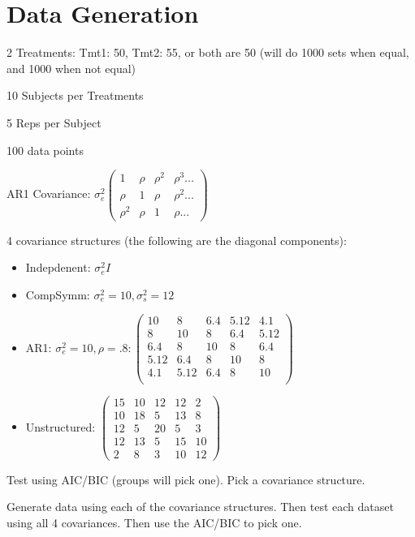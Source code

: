 \documentclass{article}
\begin{document}
\section{Data Generation}

2 Treatments: Tmt1: 50, Tmt2: 55, or both are 50 (will do 1000 sets when equal, and 1000 when not equal)

10 Subjects per Treatments

5 Reps per Subject

100 data points


AR1 Covariance: $\sigma^2_e \begin{pmatrix}
    1 & \rho & \rho^2 & \rho^3 ... \\ 
    \rho & 1 & \rho & \rho^2 ... \\
    \rho^2 & \rho & 1 & \rho ...
\end{pmatrix}$

4 covariance structures (the following are the diagonal components):
\begin{itemize}
    \item Indepdenent: $\sigma^2_e I$
    \item CompSymm: $\sigma^2_e = 10, \sigma^2_s = 12$
    \item AR1: $\sigma^2_e = 10, \rho = .8: \begin{pmatrix}
        10 & 8 & 6.4 & 5.12 & 4.1 \\
        8 & 10 & 8 & 6.4 & 5.12 \\
        6.4 & 8 & 10 & 8 & 6.4 \\
        5.12 & 6.4 & 8 & 10 & 8 \\
        4.1 & 5.12 & 6.4 & 8 & 10 \\
    \end{pmatrix}$
    \item Unstructured: $\begin{pmatrix}
        15 & 10 & 12 & 12 & 2 \\
        10 & 18 & 5 & 13 & 8 \\
        12 & 5 & 20 & 5 & 3 \\
        12 & 13 & 5 & 15 & 10 \\
        2 & 8 & 3 & 10 & 12
    \end{pmatrix}$
\end{itemize}


Test using AIC/BIC (groups will pick one). Pick a covariance structure.

Generate data using each of the covariance structures. Then test each dataset using all 4 covariances. Then use the AIC/BIC to pick one.
\end{document}
